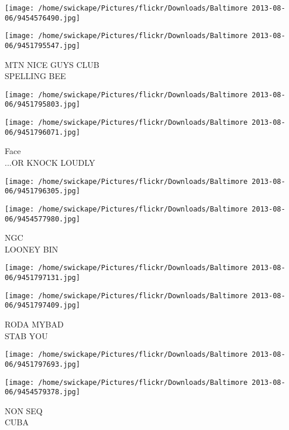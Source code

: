 \documentclass[10pt,letterpaper]{article}
\begin{document}
\texttt{[image: /home/swickape/Pictures/flickr/Downloads/Baltimore 2013-08-06/9454576490.jpg]}

\vspace{0.25in}
\texttt{[image: /home/swickape/Pictures/flickr/Downloads/Baltimore 2013-08-06/9451795547.jpg]}

MTN NICE GUYS CLUB\\
SPELLING BEE\\
\pagebreak

\texttt{[image: /home/swickape/Pictures/flickr/Downloads/Baltimore 2013-08-06/9451795803.jpg]}

\vspace{0.25in}
\texttt{[image: /home/swickape/Pictures/flickr/Downloads/Baltimore 2013-08-06/9451796071.jpg]}

Face\\
...OR KNOCK LOUDLY\\
\pagebreak

\texttt{[image: /home/swickape/Pictures/flickr/Downloads/Baltimore 2013-08-06/9451796305.jpg]}

\vspace{0.25in}
\texttt{[image: /home/swickape/Pictures/flickr/Downloads/Baltimore 2013-08-06/9454577980.jpg]}

NGC\\
LOONEY BIN\\
\pagebreak

\texttt{[image: /home/swickape/Pictures/flickr/Downloads/Baltimore 2013-08-06/9451797131.jpg]}

\vspace{0.25in}
\texttt{[image: /home/swickape/Pictures/flickr/Downloads/Baltimore 2013-08-06/9451797409.jpg]}

RODA MYBAD\\
STAB YOU\\
\pagebreak

\texttt{[image: /home/swickape/Pictures/flickr/Downloads/Baltimore 2013-08-06/9451797693.jpg]}

\vspace{0.25in}
\texttt{[image: /home/swickape/Pictures/flickr/Downloads/Baltimore 2013-08-06/9454579378.jpg]}

NON SEQ\\
CUBA\\
\pagebreak
\end{document}
